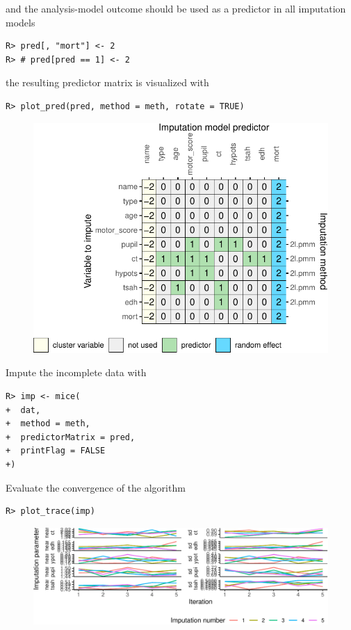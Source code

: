 \documentclass[
  article]{jss}
\begin{document}
and the analysis-model outcome should be used as a predictor in all
imputation models

\begin{verbatim}
R> pred[, "mort"] <- 2
R> # pred[pred == 1] <- 2
\end{verbatim}

the resulting predictor matrix is visualized with

\begin{verbatim}
R> plot_pred(pred, method = meth, rotate = TRUE)
\end{verbatim}

\begin{figure}[h]

{\centering \includegraphics{manuscript_files/figure-pdf/unnamed-chunk-37-1.pdf}

}

\end{figure}

Impute the incomplete data with

\begin{verbatim}
R> imp <- mice(
+  dat,
+  method = meth,
+  predictorMatrix = pred,
+  printFlag = FALSE
+)
\end{verbatim}

Evaluate the convergence of the algorithm

\begin{verbatim}
R> plot_trace(imp)
\end{verbatim}

\begin{figure}[h]

{\centering \includegraphics{manuscript_files/figure-pdf/unnamed-chunk-39-1.pdf}

}

\end{figure}
\end{document}
